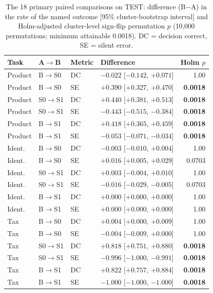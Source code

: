 \begin{table}[t]
\centering
\caption{The 18 primary paired comparisons on TEST: difference (B$-$A) in the rate of the named outcome [95\% cluster-bootstrap interval] and Holm-adjusted cluster-level sign-flip permutation $p$ (10{,}000 permutations; minimum attainable 0.0018). DC = decision correct, SE = silent error.}
\label{tab:tests}
\footnotesize
\setlength{\tabcolsep}{2.5pt}
\begin{tabular}{@{}llllr@{}}
\toprule
Task & A$\rightarrow$B & Metric & Difference & Holm $p$ \\
\midrule
Product & B$\rightarrow$S0 & DC & $-0.022$ [$-0.142$, $+0.071$] & 1.00 \\
Product & B$\rightarrow$S0 & SE & $+0.390$ [$+0.327$, $+0.470$] & \textbf{0.0018} \\
Product & S0$\rightarrow$S1 & DC & $+0.440$ [$+0.381$, $+0.513$] & \textbf{0.0018} \\
Product & S0$\rightarrow$S1 & SE & $-0.443$ [$-0.515$, $-0.384$] & \textbf{0.0018} \\
Product & B$\rightarrow$S1 & DC & $+0.418$ [$+0.365$, $+0.459$] & \textbf{0.0018} \\
Product & B$\rightarrow$S1 & SE & $-0.053$ [$-0.071$, $-0.034$] & \textbf{0.0018} \\
\midrule
Ident. & B$\rightarrow$S0 & DC & $-0.003$ [$-0.010$, $+0.004$] & 1.00 \\
Ident. & B$\rightarrow$S0 & SE & $+0.016$ [$+0.005$, $+0.029$] & 0.0703 \\
Ident. & S0$\rightarrow$S1 & DC & $+0.003$ [$-0.004$, $+0.010$] & 1.00 \\
Ident. & S0$\rightarrow$S1 & SE & $-0.016$ [$-0.029$, $-0.005$] & 0.0703 \\
Ident. & B$\rightarrow$S1 & DC & $+0.000$ [$+0.000$, $+0.000$] & 1.00 \\
Ident. & B$\rightarrow$S1 & SE & $+0.000$ [$+0.000$, $+0.000$] & 1.00 \\
\midrule
Tax & B$\rightarrow$S0 & DC & $+0.004$ [$+0.000$, $+0.009$] & 1.00 \\
Tax & B$\rightarrow$S0 & SE & $-0.004$ [$-0.009$, $+0.000$] & 1.00 \\
Tax & S0$\rightarrow$S1 & DC & $+0.818$ [$+0.751$, $+0.880$] & \textbf{0.0018} \\
Tax & S0$\rightarrow$S1 & SE & $-0.996$ [$-1.000$, $-0.991$] & \textbf{0.0018} \\
Tax & B$\rightarrow$S1 & DC & $+0.822$ [$+0.757$, $+0.884$] & \textbf{0.0018} \\
Tax & B$\rightarrow$S1 & SE & $-1.000$ [$-1.000$, $-1.000$] & \textbf{0.0018} \\
\bottomrule
\end{tabular}
\end{table}
